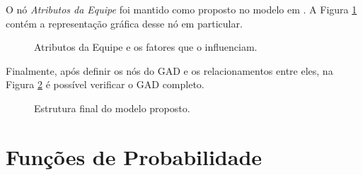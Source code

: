 O nó \textit{Atributos da Equipe} foi mantido como proposto no modelo em \cite{freire}. A Figura \ref{modelo:gad:atributos} contém a representação gráfica desse nó em particular.

\begin{figure}[ht!]
\begin{center}
	\end{center}
	\caption{Atributos da Equipe e os fatores que o influenciam.}
	\label{modelo:gad:atributos}
\end{figure}

Finalmente, após definir os nós do GAD e os relacionamentos entre eles, na Figura \ref{modelo:gad:final} é possível verificar o GAD completo.

\begin{figure}[ht!]
\begin{center}
	\end{center}
	\caption{Estrutura final do modelo proposto.}
	\label{modelo:gad:final}
\end{figure}

\section{Funções de Probabilidade}
\label{modelo:funcoes}

